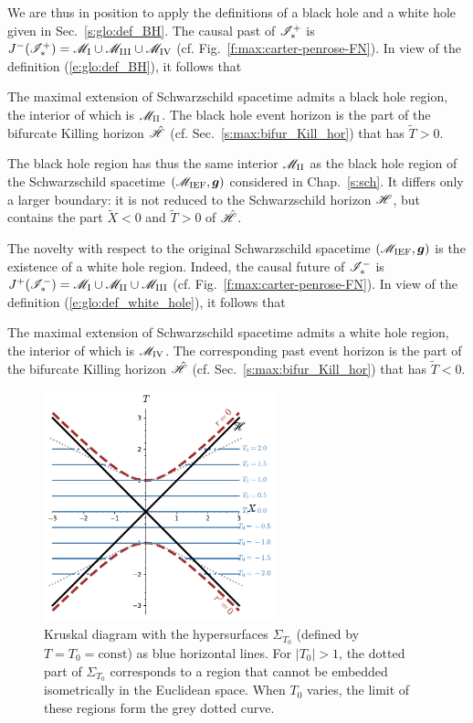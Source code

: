 We are thus in position to apply the definitions of a black hole and a white hole
given in Sec.~\ref{s:glo:def_BH}. The
causal past of $\mathscr{I}^+_*$ is $J^-(\mathscr{I}^+_*) = \mathscr{M}_{\rm I}\cup \mathscr{M}_{\rm III}\cup \mathscr{M}_{\rm IV}$
(cf. Fig.~\ref{f:max:carter-penrose-FN}). In view of the definition
(\ref{e:glo:def_BH}), it follows that
\begin{greybox}
The maximal extension of Schwarzschild spacetime admits a black hole region,
the interior of which is $\mathscr{M}_{\rm II}$. The black hole event horizon is the
part of the bifurcate Killing horizon $\hat{\mathscr{H}}$ (cf. Sec.~\ref{s:max:bifur_Kill_hor})
that has $\tilde{T}>0$.
\end{greybox}
The black hole region has thus the same interior $\mathscr{M}_{\rm II}$ as the black hole region
of the Schwarzschild spacetime $(\mathscr{M}_{\rm IEF}, \bm{g})$ considered in Chap.~\ref{s:sch}.
It differs only a larger boundary: it is not reduced to the Schwarzschild horizon $\mathscr{H}$,
but contains the part $\tilde{X}<0$ and $\tilde{T}>0$ of $\hat{\mathscr{H}}$.

The novelty with respect to the original Schwarzschild spacetime $(\mathscr{M}_{\rm IEF}, \bm{g})$
is the existence of a white hole region. Indeed, the causal future of $\mathscr{I}^-_*$ is
$J^+(\mathscr{I}^-_*) = \mathscr{M}_{\rm I}\cup \mathscr{M}_{\rm II}\cup \mathscr{M}_{\rm III}$
(cf. Fig.~\ref{f:max:carter-penrose-FN}). In view of the definition
(\ref{e:glo:def_white_hole}), it follows that
\begin{greybox}
The maximal extension of Schwarzschild spacetime admits a white hole region,
the interior of which is $\mathscr{M}_{\rm IV}$. The corresponding past event horizon is the
part of the bifurcate Killing horizon $\hat{\mathscr{H}}$ (cf. Sec.~\ref{s:max:bifur_Kill_hor})
that has $\tilde{T}<0$.
\end{greybox}


\begin{figure}
\centerline{\includegraphics[width=0.6\textwidth]{max_constant_T_slices.pdf}}
\caption[]{\label{f:max:constant_T_slices} \footnotesize
Kruskal diagram with the hypersurfaces $\Sigma_{T_0}$ (defined by $T=T_0 = \mathrm{const}$) as blue horizontal lines. For $|T_0|>1$, the dotted part of
$\Sigma_{T_0}$ corresponds to a region that cannot be embedded isometrically in
the Euclidean space. When $T_0$ varies, the limit of these regions form
the grey dotted curve.}
\end{figure}

